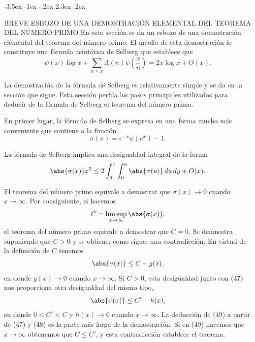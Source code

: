 \documentclass[12pt,a4paper]{book}
\makeatletter
\renewcommand\section{\@startsection{section}{1}{\z@}%
  {-3.5ex \@plus -1ex \@minus -.2ex}%
  {2.3ex \@plus .2ex}%
  {\normalfont\Large\bfseries\raggedright}}
\makeatother
\begin{document}
    \section{BREVE ESBOZO DE UNA DEMOSTRACIÓN ELEMENTAL DEL TEOREMA DEL NÚMERO PRIMO}
    En esta sección se da un esbozo de una demostración elemental del teorema del
    número primo. El meollo de esta demostración lo constituye una fórmula asintótica
    de Selberg que establece que
    \begin{equation*}
        \psi(x)\log x+\sum_{n\leq x}\Lambda(n)\psi\left(\frac{x}{n}\right)=2x\log x+O(x).
    \end{equation*}

    La demostración de la fórmula de Selberg es relativamente simple y se da en la
    sección que sigue. Esta sección perfila los pasos principales utilizados para
    deducir de la fórmula de Selberg el teorema del número primo.

    En primer lugar, la fórmula de Selberg se expresa en una forma mucho más
    conveniente que contiene a la función
    \begin{equation*}
        \sigma(x)=e^{-x}\psi(e^{x})-1.
    \end{equation*}
    \begin{teorema}
        La fórmula de Selberg implica una desigualdad integral de la forma
        \begin{equation}
            \abs{\sigma(x)}x^{2}\leq2\int_{0}^{x}\int_{0}^{y}\abs{\sigma(u)}\,du\,dy+O(x).
        \end{equation}
    \end{teorema}

    El teorema del número primo equivale a demostrar que $\sigma(x)\to0$ cuando
    $x\to\infty$. Por consiguiente, si hacemos
    \begin{equation*}
        C=\limsup_{x\to\infty}\abs{\sigma(x)},
    \end{equation*}
    el teorema del número primo equivale a demostrar que $C=0$. Se demuestra
    suponiendo que $C>0$ y se obtiene, como sigue, una contradicción. En virtud de la
    definición de $C$ tenemos
    \begin{equation}
        \abs{\sigma(x)}\leq C+g(x),
    \end{equation}
    en donde $g(x)\to0$ cuando $x\to\infty$. Si $C>0$, esta desigualdad junto con
    (47) nos proporciona otra desigualdad del mismo tipo,
    \begin{equation}
        \abs{\sigma(x)}\leq C'+h(x),
    \end{equation}
    en donde $0<C'<C$ y $h(x)\to0$ cuando $x\to\infty$. La deducción de (49) a partir
    de (47) y (48) es la parte más larga de la demostración. Si en (49) hacemos que
    $x\to\infty$ obtenemos que $C\leq C'$, y esta contradicción establece el teorema.
\end{document}
